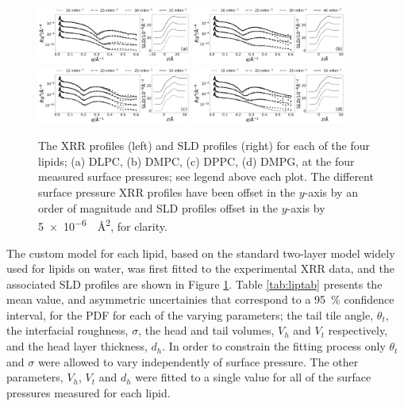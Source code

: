 \documentclass[twocolumn,a4paper]{paper}
\begin{document}
%
\begin{figure}
	\centering
	\includegraphics[width=0.45\textwidth]{figures/dlpc_ref_sld}
	\includegraphics[width=0.45\textwidth]{figures/dmpc_ref_sld}
	\includegraphics[width=0.45\textwidth]{figures/dppc_ref_sld}
	\includegraphics[width=0.45\textwidth]{figures/dmpg_ref_sld}
	\caption{\small The XRR profiles (left) and SLD profiles (right) for each of the four lipids; (a) DLPC, (b) DMPC, (c) DPPC, (d) DMPG, at the four measured surface pressures; see legend above each plot. The different surface pressure XRR profiles have been offset in the $y$-axis by an order of magnitude and SLD profiles offset in the $y$-axis by \SI{5e-6}{\per\square\angstrom}, for clarity.}
	\label{fig:lipids}
\end{figure}
%

The custom model for each lipid, based on the standard two-layer model widely used for lipids on water, was first fitted to the experimental XRR data, and the associated SLD profiles are shown in Figure \ref{fig:lipids}.
Table \ref{tab:liptab} presents the mean value, and asymmetric uncertainies that correspond to a \SI{95}{\percent} confidence interval, for the PDF for each of the varying parameters; the tail tile angle, $\theta_t$, the interfacial roughness, $\sigma$, the head and tail volumes, $V_h$ and $V_t$ respectively, and the head layer thickness, $d_h$.
In order to constrain the fitting process only $\theta_t$ and $\sigma$ were allowed to vary independently of surface pressure. The other parameters, $V_h$, $V_t$ and $d_h$ were fitted to a single value for all of the surface pressures measured for each lipid.
\end{document}
